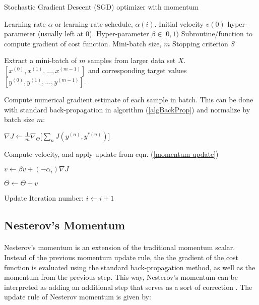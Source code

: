 \documentclass[12pt,letterpaper]{article}
\begin{document}
\begin{algorithm}
\caption{Stochastic Gradient Descent (SGD) optimizer with momentum}
\label{algSGD}

\begin{algorithmic}

\REQUIRE Learning rate $\alpha$ or learning rate schedule, $\alpha(i)$.
\REQUIRE Initial velocity $v(0)$ hyper-parameter (usually left at $0$).
\REQUIRE Hyper-parameter $\beta \in [0,1)$
\REQUIRE Subroutine/function to compute gradient of cost function.
\REQUIRE Mini-batch size, $m$
\REQUIRE Stopping criterion $S$

	\item Extract a mini-batch of $m$ samples from larger data set $X$. $[x^{(0)},x^{(1)},...,x^{(m-1)}]$ and corresponding target values 
	$[y^{(0)},y^{(1)},...,y^{(m-1)}]$.
	\item Compute numerical gradient estimate of each sample in batch. This can be done with standard back-propagation in algorithm (\ref{algBackProp}) and 			 	normalize by batch size $m$:
	\item $\nabla J \leftarrow \frac{1}{m}\nabla_{\Theta} \Big[ \sum_n J(y^{(n)},y^{*(n)}) \Big] $
	\item Compute velocity, and apply update from eqn. (\ref{momentum update})
	\item $v \leftarrow \beta v + (-\alpha_i)\nabla J$
	\item $\Theta \leftarrow \Theta + v$
	\item Update Iteration number: $i \leftarrow i + 1$
\ENDWHILE

\end{algorithmic}
\end{algorithm}


\subsection{Nesterov's Momentum}

\paragraph*{}Nesterov's momentum is an extension of the traditional momentum scalar. Instead of the previous momentum update rule, the the gradient of the cost function is evaluated using the standard back-propagation method, as well as the momentum from the previous step. This way, Nesterov's momentum can be interpreted as adding an additional step that serves as a sort of correction \cite{Geron,Goodfellow}. The update rule of Nesterov momentum is given by:
\end{document}
